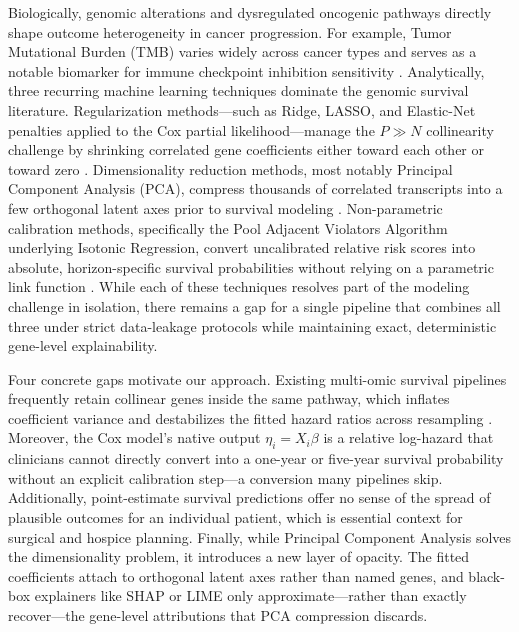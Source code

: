 \documentclass[10pt,a4paper]{article}
\begin{document}
Biologically, genomic alterations and dysregulated oncogenic pathways directly shape outcome heterogeneity in cancer progression. For example, Tumor Mutational Burden (TMB) varies widely across cancer types and serves as a notable biomarker for immune checkpoint inhibition sensitivity \cite{chalmers2017mutational}. 
Analytically, three recurring machine learning techniques dominate the genomic survival literature. Regularization methods---such as Ridge, LASSO, and Elastic-Net penalties applied to the Cox partial likelihood---manage the $P \gg N$ collinearity challenge by shrinking correlated gene coefficients either toward each other or toward zero \cite{simon2011regularization, wu2012elastic, tibshirani1997lasso}. Dimensionality reduction methods, most notably Principal Component Analysis (PCA), compress thousands of correlated transcripts into a few orthogonal latent axes prior to survival modeling \cite{bishop2006pattern, hastie2009elements}. Non-parametric calibration methods, specifically the Pool Adjacent Violators Algorithm underlying Isotonic Regression, convert uncalibrated relative risk scores into absolute, horizon-specific survival probabilities without relying on a parametric link function \cite{zadrozny2002transforming, jain2024isotonic}. While each of these techniques resolves part of the modeling challenge in isolation, there remains a gap for a single pipeline that combines all three under strict data-leakage protocols while maintaining exact, deterministic gene-level explainability.

Four concrete gaps motivate our approach. Existing multi-omic survival pipelines frequently retain collinear genes inside the same pathway, which inflates coefficient variance and destabilizes the fitted hazard ratios across resampling \cite{simon2011regularization}. Moreover, the Cox model's native output $\eta_i = X_i \beta$ is a relative log-hazard that clinicians cannot directly convert into a one-year or five-year survival probability without an explicit calibration step---a conversion many pipelines skip. Additionally, point-estimate survival predictions offer no sense of the spread of plausible outcomes for an individual patient, which is essential context for surgical and hospice planning. Finally, while Principal Component Analysis solves the dimensionality problem, it introduces a new layer of opacity. The fitted coefficients attach to orthogonal latent axes rather than named genes, and black-box explainers like SHAP or LIME only approximate---rather than exactly recover---the gene-level attributions that PCA compression discards.
\end{document}
